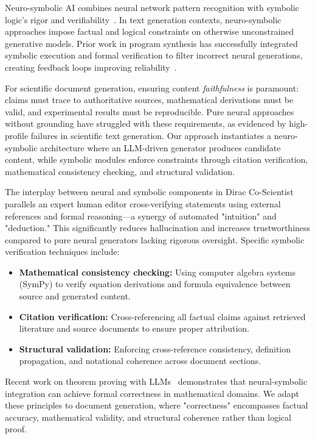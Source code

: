 \documentclass{ieeeaccess}
\begin{document}
Neuro-symbolic AI combines neural network pattern recognition with symbolic logic's rigor and verifiability~\cite{garcez2022neurosymbolic}. In text generation contexts, neuro-symbolic approaches impose factual and logical constraints on otherwise unconstrained generative models. Prior work in program synthesis has successfully integrated symbolic execution and formal verification to filter incorrect neural generations, creating feedback loops improving reliability~\cite{wang2024execution}.

For scientific document generation, ensuring content \textit{faithfulness} is paramount: claims must trace to authoritative sources, mathematical derivations must be valid, and experimental results must be reproducible. Pure neural approaches without grounding have struggled with these requirements, as evidenced by high-profile failures in scientific text generation. Our approach instantiates a neuro-symbolic architecture where an LLM-driven generator produces candidate content, while symbolic modules enforce constraints through citation verification, mathematical consistency checking, and structural validation.

The interplay between neural and symbolic components in Dirac Co-Scientist parallels an expert human editor cross-verifying statements using external references and formal reasoning—a synergy of automated "intuition" and "deduction." This significantly reduces hallucination and increases trustworthiness compared to pure neural generators lacking rigorous oversight. Specific symbolic verification techniques include:

\begin{itemize}
\item \textbf{Mathematical consistency checking:} Using computer algebra systems (SymPy) to verify equation derivations and formula equivalence between source and generated content.
\item \textbf{Citation verification:} Cross-referencing all factual claims against retrieved literature and source documents to ensure proper attribution.
\item \textbf{Structural validation:} Enforcing cross-reference consistency, definition propagation, and notational coherence across document sections.
\end{itemize}

Recent work on theorem proving with LLMs~\cite{polu2023formal, first2023proof} demonstrates that neural-symbolic integration can achieve formal correctness in mathematical domains. We adapt these principles to document generation, where "correctness" encompasses factual accuracy, mathematical validity, and structural coherence rather than logical proof.
\end{document}
